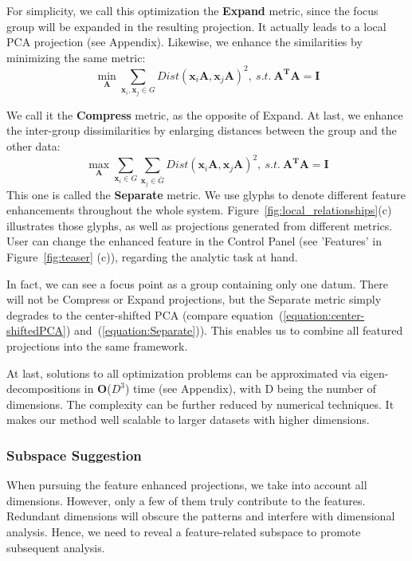For simplicity, we call this optimization the \textbf{Expand} metric, since the focus group will be expanded in the resulting projection. It actually leads to a local PCA projection (see Appendix). Likewise, we enhance the similarities by minimizing the same metric:
\begin{equation}
\min_{\mathbf{A}} \sum\limits_{\mathbf{x}_{i}, \mathbf{x}_{j} \in G} Dist(\mathbf{x}_{i}\mathbf{A}, \mathbf{x}_{j}\mathbf{A})^{2},\ s.t.\ \mathbf{A^{T}A} = \mathbf{I}
\end{equation}
  
We call it the \textbf{Compress} metric, as the opposite of Expand. At last, we enhance the inter-group dissimilarities by enlarging distances between the group and the other data:
\begin{equation}
\label{equation:Separate}
\max_{\mathbf{A}} \sum\limits_{\mathbf{x}_{i} \in G} \sum\limits_{\mathbf{x}_{j} \in \bar{G}} Dist(\mathbf{x}_{i}\mathbf{A}, \mathbf{x}_{j}\mathbf{A})^{2},\ s.t.\ \mathbf{A^{T}A} = \mathbf{I}
\end{equation}
This one is called the \textbf{Separate} metric. We use glyphs to denote different feature enhancements throughout the whole system. Figure~\ref{fig:local_relationships}(c) illustrates those glyphs, as well as projections generated from different metrics. User can change the enhanced feature in the Control Panel (see 'Features' in Figure~\ref{fig:teaser} (c)), regarding the analytic task at hand.

In fact, we can see a focus point as a group containing only one datum. There will not be Compress or Expand projections, but the Separate metric simply degrades to the center-shifted PCA (compare equation~(\ref{equation:center-shiftedPCA}) and~(\ref{equation:Separate})). This enables us to combine all featured projections into the same framework.

At last, solutions to all optimization problems can be approximated via eigen-decompositions in \textbf{O}($D^3$) time (see Appendix), with D being the number of dimensions. The complexity can be further reduced by numerical techniques. It makes our method well scalable to larger datasets with higher dimensions.

\subsubsection{Subspace Suggestion}
When pursuing the feature enhanced projections, we take into account all dimensions. However, only a few of them truly contribute to the features. Redundant dimensions will obscure the patterns and interfere with dimensional analysis. Hence, we need to reveal a feature-related subspace to promote subsequent analysis.

